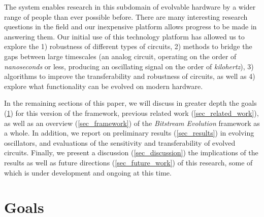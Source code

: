 \documentclass{ieeeaccess}
\begin{document}
The system enables research in this subdomain of evolvable hardware by a wider range of people than ever possible before. There are many interesting research questions in the field and our inexpensive platform allows progress to be made in answering them. Our initial use of this technology platform has allowed us to explore the 
1) robustness of different types of circuits, 
2) methods to bridge the gaps between large timescales (an analog circuit, operating on the order of \textit{nanoseconds} or less, producing an oscillating signal on the order of \textit{kilohertz}), 
3) algorithms to improve the transferability and robustness of circuits, as well as
4) explore what functionality can be evolved on modern hardware.





In the remaining sections of this paper, we will discuss in greater depth the goals (\ref{sec_goals}) for this version of the framework, previous related work (\ref{sec_related_work}), as well as an overview (\ref{sec_framework}) of the \textit{Bitstream Evolution} framework as a whole. 
In addition, we report on preliminary results (\ref{sec_results}) in evolving oscillators, and evaluations of the sensitivity and transferability of evolved circuits. Finally, we present a discussion (\ref{sec_discussion}) the implications of the results as well as future directions (\ref{sec_future_work}) of this research, some of which is under development and ongoing at this time.

%
%




\section{Goals}\label{sec_goals}

\end{document}
